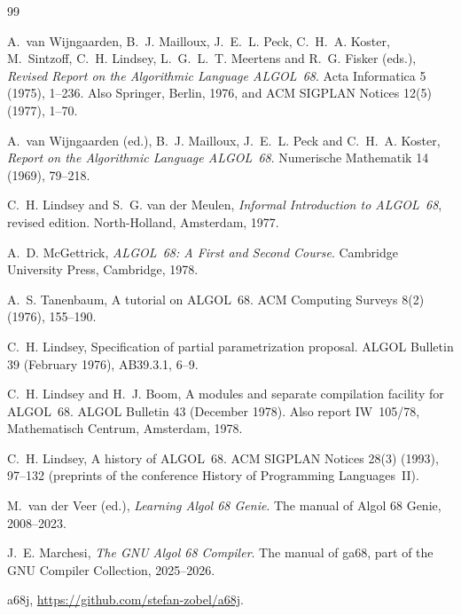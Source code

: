 \begin{thebibliography}{99}

A.~van Wijngaarden, B.~J. Mailloux, J.~E.~L. Peck, C.~H.~A. Koster,
M.~Sintzoff, C.~H. Lindsey, L.~G.~L.~T. Meertens and R.~G. Fisker (eds.),
\emph{Revised Report on the Algorithmic Language ALGOL~68}.
Acta Informatica 5 (1975), 1--236. Also Springer, Berlin, 1976, and
ACM SIGPLAN Notices 12(5) (1977), 1--70.

A.~van Wijngaarden (ed.), B.~J. Mailloux, J.~E.~L. Peck and
C.~H.~A. Koster, \emph{Report on the Algorithmic Language ALGOL~68}.
Numerische Mathematik 14 (1969), 79--218.

C.~H. Lindsey and S.~G. van der Meulen,
\emph{Informal Introduction to ALGOL~68}, revised edition.
North-Holland, Amsterdam, 1977.

A.~D. McGettrick, \emph{ALGOL~68: A First and Second Course}.
Cambridge University Press, Cambridge, 1978.

A.~S. Tanenbaum, A tutorial on ALGOL~68.
ACM Computing Surveys 8(2) (1976), 155--190.

C.~H. Lindsey, Specification of partial parametrization proposal.
ALGOL Bulletin 39 (February 1976), AB39.3.1, 6--9.

C.~H. Lindsey and H.~J. Boom, A modules and separate compilation facility
for ALGOL~68. ALGOL Bulletin 43 (December 1978). Also report IW~105/78,
Mathematisch Centrum, Amsterdam, 1978.

C.~H. Lindsey, A history of ALGOL~68. ACM SIGPLAN Notices 28(3) (1993),
97--132 (preprints of the conference History of Programming
Languages~II).

M.~van der Veer (ed.), \emph{Learning Algol 68 Genie}. The manual of
Algol 68 Genie, 2008--2023.

J.~E. Marchesi, \emph{The GNU Algol 68 Compiler}. The manual of ga68,
part of the GNU Compiler Collection, 2025--2026.

a68j, \url{https://github.com/stefan-zobel/a68j}.

\end{thebibliography}
